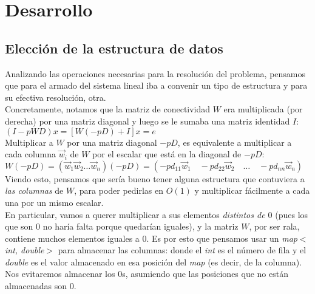 \section{Desarrollo}


	\subsection{Elección de la estructura de datos}

		Analizando las operaciones necesarias para la resolución del problema, pensamos que para el armado del sistema lineal iba a convenir un tipo de estructura y para su efectiva resolución, otra. \\

		Concretamente, notamos que la matriz de conectividad $W$ era multiplicada (por derecha) por una matriz diagonal y luego se le sumaba una matriz identidad $I$: \\

		$(I - pWD) x = [W (-pD) + I] x = e$ \\

		Multiplicar a $W$ por una matriz diagonal $-pD$, es equivalente a multiplicar a cada columna $\vec{w}_i$ de $W$ por el escalar que está en la diagonal de $-pD$: \\

		$ W (-pD) = \left( \vec{w}_1 \vec{w}_2 \hdots \vec{w}_n \right) (-pD) = \left( -p d_{11} \vec{w}_1 \quad -p d_{22} \vec{w}_2 \quad \hdots \quad -p d_{nn} \vec{w}_n \right)$ \\

		Viendo esto, pensamos que sería bueno tener alguna estructura que contuviera a \textit{las columnas} de $W$, para poder pedirlas en $O(1)$ y multiplicar fácilmente a cada una por un mismo escalar. \\

		En particular, vamos a querer multiplicar a sus elementos \textit{distintos de $0$} (pues los que son $0$ no haría falta porque quedarían iguales), y la matriz $W$, por ser rala, contiene muchos elementos iguales a $0$. Es por esto que pensamos usar un \textit{map$<$int, double$>$} para almacenar las columnas: donde el \textit{int} es el número de fila y el \textit{double} es el valor almacenado en esa posición del \textit{map} (es decir, de la columna). Nos evitaremos almacenar los $0$s, asumiendo que las posiciones que no están almacenadas son $0$. \\


